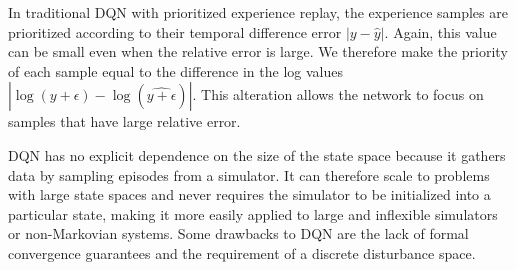 In traditional DQN with prioritized experience replay, the experience samples are prioritized according to their temporal difference error $|y - \hat{y}|$. Again, this value can be small even when the relative error is large. We therefore make the priority of each sample equal to the difference in the log values $|\log(y + \epsilon) - \log(\hat{y + \epsilon})|$. This alteration allows the network to focus on samples that have large relative error. 

DQN has no explicit dependence on the size of the state space because it gathers data by sampling episodes from a simulator. It can therefore scale to problems with large state spaces and never requires the simulator to be initialized into a particular state, making it more easily applied to large and inflexible simulators or non-Markovian systems. Some drawbacks to DQN are the lack of formal convergence guarantees and the requirement of a discrete disturbance space.

